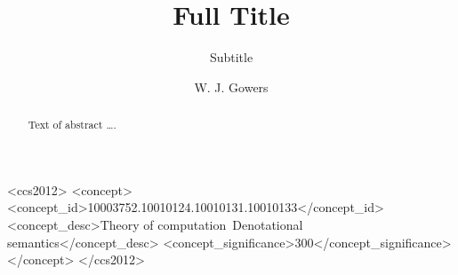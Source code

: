 \documentclass[sigplan,10pt,review]{acmart}\settopmatter{printfolios=true,printccs=false,printacmref=false}
\begin{document}
\title[Short Title]{Full Title}         %
\subtitle{Subtitle}                     %



\author{W. J. Gowers}

\begin{abstract}
Text of abstract \ldots.
\end{abstract}


\begin{CCSXML}
<ccs2012>
<concept>
<concept_id>10003752.10010124.10010131.10010133</concept_id>
<concept_desc>Theory of computation~Denotational semantics</concept_desc>
<concept_significance>300</concept_significance>
</concept>
</ccs2012>
\end{CCSXML}
\end{document}
